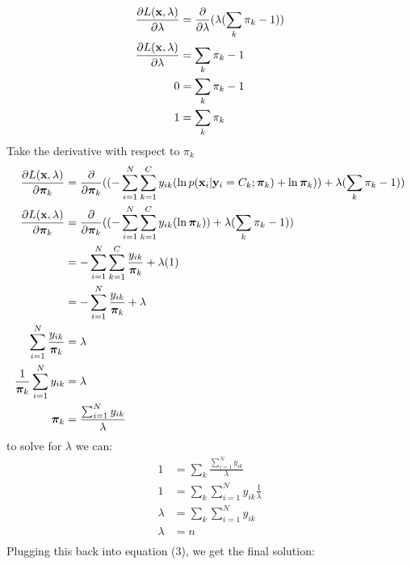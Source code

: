 \documentclass[submit]{harvardml}
\begin{document}
\begin{enumerate}
\begin{equation}
\begin{split}
            \frac{\partial L(\mathbf{x}, \lambda)}{\partial \lambda} &= \frac{\partial}{\partial \lambda}( \lambda (\sum_k\pi_k - 1)) \\
            \frac{\partial L(\mathbf{x}, \lambda)}{\partial \lambda} &= \sum_k\pi_k - 1 \\
            0 &= \sum_k\pi_k - 1 \\
            1 &= \sum_k\pi_k \\
        \end{split}
    \end{equation}
    Take the derivative with respect to $\pi_k$
    \begin{equation}
        \begin{split}
            \frac{\partial L(\mathbf{x}, \lambda)}{\partial \boldsymbol{\pi}_k} &= \frac{\partial}{\partial \boldsymbol{\pi}_k}((-\sum_{i=1}^{N} \sum_{k=1}^{C} y_{ik} (\ln p(\mathbf{x}_i | \mathbf{y}_i = C_k; \boldsymbol{\pi}_k) + \ln \boldsymbol{\pi}_k)) + \lambda (\sum_k\pi_k - 1)) \\
            \frac{\partial L(\mathbf{x}, \lambda)}{\partial \boldsymbol{\pi}_k} &= \frac{\partial}{\partial \boldsymbol{\pi}_k}((-\sum_{i=1}^{N} \sum_{k=1}^{C} y_{ik}( \ln \boldsymbol{\pi}_k)) + \lambda (\sum_k\pi_k - 1)) \\
             &= -\sum_{i=1}^{N} \sum_{k=1}^{C} \frac{y_{ik}}{\boldsymbol{\pi}_k} + \lambda (1) \\
             &= -\sum_{i=1}^{N}  \frac{y_{ik}}{\boldsymbol{\pi}_k} + \lambda \\
             \sum_{i=1}^{N}  \frac{y_{ik}}{\boldsymbol{\pi}_k} &=  \lambda \\             \frac{1}{\boldsymbol{\pi}_k}\sum_{i=1}^{N}  y_{ik} &=  \lambda \\
             \boldsymbol{\pi}_k &= \frac{\sum_{i=1}^{N}  y_{ik}}{\lambda} \\
        \end{split}
    \end{equation}
    to solve for $\lambda$ we can:
    \begin{equation}
        \begin{split}
            1 &= \sum_k\frac{\sum_{i=1}^{N}  y_{ik}}{\lambda}\\
            1 &= \sum_k\sum_{i=1}^{N}  y_{ik}\frac{1}{\lambda}\\
            \lambda &= \sum_k\sum_{i=1}^{N}  y_{ik}\\
            \lambda &= n\\
        \end{split}
    \end{equation}
    Plugging this back into equation (3), we get the final solution:

\end{enumerate}
\end{document}
